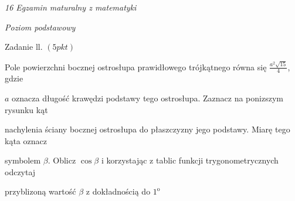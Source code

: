 \documentclass[a4paper,12pt]{article}
\begin{document}
{\it 16 Egzamin maturalny z matematyki}

{\it Poziom podstawowy}

Zadanie ll. $(5pkt)$

Pole powierzchni bocznej ostrosłupa prawidłowego trójkątnego równa się $\displaystyle \frac{a^{2}\sqrt{15}}{4}$, gdzie

$a$ oznacza długość krawędzi podstawy tego ostrosłupa. Zaznacz na ponizszym rysunku kąt

nachylenia ściany bocznej ostrosłupa do płaszczyzny jego podstawy. Miarę tego kąta oznacz

symbolem $\beta$. Oblicz $\cos\beta$ i korzystając z tablic funkcji trygonometrycznych odczytaj

przyblizoną wartość $\beta$ z dokładnością do $1^{\mathrm{o}}$
\end{document}
